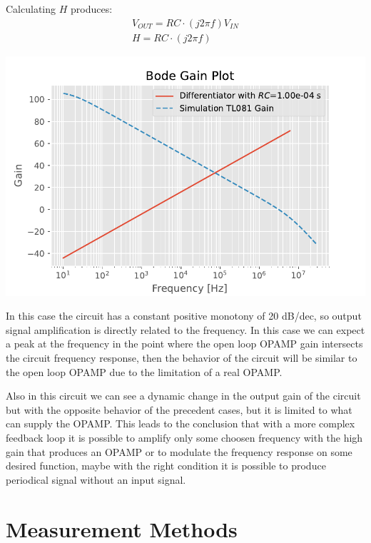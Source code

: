 \documentclass[a4paper, twocolumn]{article}
\begin{document}
Calculating \(H\) produces:
\begin{gather}
    V_{OUT}=RC\cdot(j2\pi f)V_{IN}\\
    H = RC\cdot(j2\pi f)
\end{gather}

\begin{center}
    \includegraphics[width=\columnwidth]{def_graph/DifferentiatorBodeTheo.pdf}
    \label{fig:DiffBodeGraphTheo}
\end{center}

In this case the circuit has a constant positive monotony of 20 dB/dec, so output signal amplification is directly related to the frequency. In this case we can expect a peak at the frequency in the point where the open loop OPAMP gain intersects the circuit frequency response, then the behavior of the circuit will be similar to the open loop OPAMP due to the limitation of a real OPAMP.

Also in this circuit we can see a dynamic change in the output gain of the circuit but with the opposite behavior of the precedent cases, but it is limited to what can supply the OPAMP. This leads to the conclusion that with a more complex feedback loop it is possible to amplify only some choosen frequency with the high gain that produces an OPAMP or to modulate the frequency response on some desired function, maybe with the right condition it is possible to produce periodical signal without an input signal.

\section{Measurement Methods}

\end{document}
